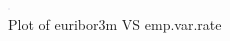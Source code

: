 \clearpage{}
\begin{figure}[!ht]
 \centering
\includegraphics[width=2.5]{assignment2/1-4- eur and emp features.png}
\caption{\label{fig:2dplot1}Plot of euribor3m VS emp.var.rate }
\end{figure}



